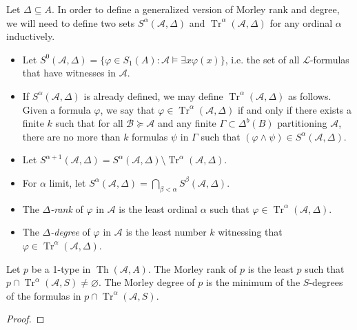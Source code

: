 \documentclass{article}
\DeclareMathOperator{\Th}{Th}
\DeclareMathOperator{\Tr}{Tr}
\let\mc\mathcal
\begin{document}
\begin{definition}
    Let $\Delta \subseteq A$. In order to define a generalized version of Morley rank and degree, we will need to define two sets $S^{\alpha}(\mc{A}, \Delta)$ and $\Tr^{\alpha}(\mc{A}, \Delta)$ for any ordinal $\alpha$ inductively.
    \begin{itemize}
        \item Let $S^{0}(\mc{A}, \Delta) = \{ \varphi \in S_1(A) : \mc{A} \vDash \exists x \varphi(x) \}$, i.e. the set of all $\mc{L}$-formulas that have witnesses in $\mc{A}$.

        \item If $S^{\alpha}(\mc{A}, \Delta)$ is already defined, we may define $\Tr^{\alpha}(\mc{A}, \Delta)$ as follows. Given a formula $\varphi$, we say that $\varphi \in \Tr^{\alpha}(\mc{A}, \Delta)$ if and only if there exists a finite $k$ such that for all $\mc{B} \succeq \mc{A}$ and any finite $\Gamma \subset \Delta^{b}(B)$ partitioning $\mc{A}$, there are no more than $k$ formulas $\psi$ in $\Gamma$ such that $(\varphi \land \psi) \in S^{\alpha}(\mc{A}, \Delta)$.
        
        \item Let $S^{\alpha+1}(\mc{A}, \Delta) = S^{\alpha}(\mc{A}, \Delta) \setminus \Tr^{\alpha}(\mc{A}, \Delta)$.

        \item For $\alpha$ limit, let $S^{\alpha}(\mc{A}, \Delta) = \bigcap_{\beta < \alpha} S^{\beta}(\mc{A}, \Delta)$.

        \item The \textit{$\Delta$-rank} of $\varphi$ in $\mc{A}$ is the least ordinal $\alpha$ such that $\varphi \in \Tr^{\alpha}(\mc{A}, \Delta)$.
        
        \item The \textit{$\Delta$-degree} of $\varphi$ in $\mc{A}$ is the least number $k$ witnessing that $\varphi \in \Tr^{\alpha}(\mc{A}, \Delta)$.
    \end{itemize}
\end{definition}

\begin{proposition}\label{dRank}
    Let $p$ be a 1-type in $\Th(\mc{A}, A)$. The Morley rank of $p$ is the least $p$ such that $p \cap \Tr^{\alpha}(\mc{A}, S) \neq \varnothing$. The Morley degree of $p$ is the minimum of the $S$-degrees of the formulas in $p \cap \Tr^{\alpha}(\mc{A}, S)$.
\end{proposition}
\begin{proof}
\end{proof}
\end{document}
